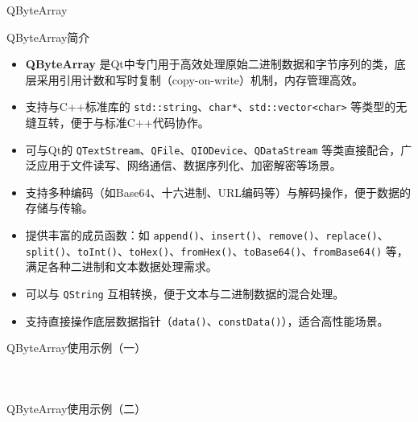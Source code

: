\documentclass[UTF8,aspectratio=169]{beamer}
\begin{document}
\begin{frame}{QByteArray}
    \begin{ytublock}{QByteArray简介}
        \begin{itemize}
            \item \textbf{QByteArray} 是Qt中专门用于高效处理原始二进制数据和字节序列的类，底层采用引用计数和写时复制（copy-on-write）机制，内存管理高效。
            \item 支持与C++标准库的 \texttt{std::string}、\texttt{char*}、\texttt{std::vector<char>} 等类型的无缝互转，便于与标准C++代码协作。
            \item 可与Qt的 \texttt{QTextStream}、\texttt{QFile}、\texttt{QIODevice}、\texttt{QDataStream} 等类直接配合，广泛应用于文件读写、网络通信、数据序列化、加密解密等场景。
            \item 支持多种编码（如Base64、十六进制、URL编码等）与解码操作，便于数据的存储与传输。
            \item 提供丰富的成员函数：如 \texttt{append()}、\texttt{insert()}、\texttt{remove()}、\texttt{replace()}、\texttt{split()}、\texttt{toInt()}、\texttt{toHex()}、\texttt{fromHex()}、\texttt{toBase64()}、\texttt{fromBase64()} 等，满足各种二进制和文本数据处理需求。
            \item 可以与 \texttt{QString} 互相转换，便于文本与二进制数据的混合处理。
            \item 支持直接操作底层数据指针（\texttt{data()}、\texttt{constData()}），适合高性能场景。
        \end{itemize}
    \end{ytublock}
\end{frame}

\begin{frame}[fragile]{QByteArray使用示例（一）}
    \begin{columns}
        \begin{column}{0.48\textwidth}
            \inputminted[firstline=1,lastline=17]{cpp}{code/qt_bytearray_example.cpp}
        \end{column}
        \begin{column}{0.48\textwidth}
            \inputminted[firstline=18,lastline=34]{cpp}{code/qt_bytearray_example.cpp}
        \end{column}
    \end{columns}
\end{frame}

\begin{frame}[fragile]{QByteArray使用示例（二）}
    \begin{columns}
        \begin{column}{0.48\textwidth}
            \inputminted[firstline=35,lastline=52]{cpp}{code/qt_bytearray_example.cpp}
        \end{column}
        \begin{column}{0.48\textwidth}
            \inputminted[firstline=53,lastline=68]{cpp}{code/qt_bytearray_example.cpp}
        \end{column}
    \end{columns}
\end{frame}
\end{document}
